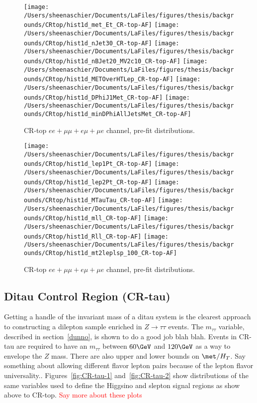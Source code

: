 \begin{figure}
    \centering
    \texttt{[image: /Users/sheenaschier/Documents/LaFiles/figures/thesis/backgrounds/CRtop/hist1d\_met\_Et\_CR-top-AF]}
    \texttt{[image: /Users/sheenaschier/Documents/LaFiles/figures/thesis/backgrounds/CRtop/hist1d\_nJet30\_CR-top-AF]}
    \texttt{[image: /Users/sheenaschier/Documents/LaFiles/figures/thesis/backgrounds/CRtop/hist1d\_nBJet20\_MV2c10\_CR-top-AF]}
    \texttt{[image: /Users/sheenaschier/Documents/LaFiles/figures/thesis/backgrounds/CRtop/hist1d\_METOverHTLep\_CR-top-AF]}
     \texttt{[image: /Users/sheenaschier/Documents/LaFiles/figures/thesis/backgrounds/CRtop/hist1d\_DPhiJ1Met\_CR-top-AF]}
     \texttt{[image: /Users/sheenaschier/Documents/LaFiles/figures/thesis/backgrounds/CRtop/hist1d\_minDPhiAllJetsMet\_CR-top-AF]}
        
    \caption{CR-top $ee+\mu\mu +e\mu + \mu e$ channel, pre-fit distributions.}
    \label{fig:CR-top-1}
\end{figure} 

\begin{figure}
    \centering
        \texttt{[image: /Users/sheenaschier/Documents/LaFiles/figures/thesis/backgrounds/CRtop/hist1d\_lep1Pt\_CR-top-AF]}
        \texttt{[image: /Users/sheenaschier/Documents/LaFiles/figures/thesis/backgrounds/CRtop/hist1d\_lep2Pt\_CR-top-AF]}
        \texttt{[image: /Users/sheenaschier/Documents/LaFiles/figures/thesis/backgrounds/CRtop/hist1d\_MTauTau\_CR-top-AF]}
        \texttt{[image: /Users/sheenaschier/Documents/LaFiles/figures/thesis/backgrounds/CRtop/hist1d\_mll\_CR-top-AF]}
        \texttt{[image: /Users/sheenaschier/Documents/LaFiles/figures/thesis/backgrounds/CRtop/hist1d\_Rll\_CR-top-AF]}
        \texttt{[image: /Users/sheenaschier/Documents/LaFiles/figures/thesis/backgrounds/CRtop/hist1d\_mt2leplsp\_100\_CR-top-AF]}
        
    \caption{CR-top $ee+\mu\mu +e\mu + \mu e$ channel, pre-fit distributions.}
    \label{fig:CR-top-2}
\end{figure}

\subsection{Ditau Control Region (CR-tau)}
Getting a handle of the invariant mass of a ditau system is the clearest approach to constructing a dilepton sample enriched in $Z\rightarrow\tau\tau$ events.  The $m_{\tau\tau}$ variable, described in section~\ref{dunno}, is shown to do a good job blah blah.  Events in CR-tau are required to have an $m_{\tau\tau}$ between $60 \GeV$ and $120 \GeV$ as a way to envelope the $Z$ mass.  There are also upper and lower bounds on $\met/H_T$.  Say something about allowing different flavor lepton pairs because of the lepton flavor universality..  Figures~\ref{fig:CR-tau-1} and~\ref{fig:CR-tau-2} show distributions of the same variables used to define the Higgsino and slepton signal regions as show above to CR-top.  \textcolor{red}{Say more about these plots}


